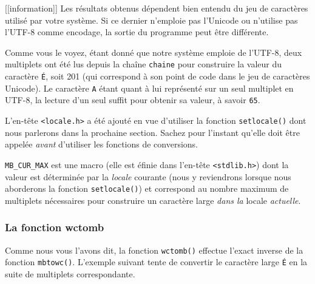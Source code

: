 \documentclass[]{article}
\begin{document}
{[}{[}information{]}{]} \textbar{} Les résultats obtenus dépendent bien
entendu du jeu de caractères utilisé par votre système. Si ce dernier
n'emploie pas l'Unicode ou n'utilise pas l'UTF-8 comme encodage, la
sortie du programme peut être différente.

Comme vous le voyez, étant donné que notre système emploie de l'UTF-8,
deux multiplets ont été lus depuis la chaîne \texttt{chaine} pour
construire la valeur du caractère \texttt{É}, soit 201 (qui correspond à
son point de code dans le jeu de caractères Unicode). Le caractère
\texttt{A} étant quant à lui représenté sur un seul multiplet en UTF-8,
la lecture d'un seul suffit pour obtenir sa valeur, à savoir
\texttt{65}.

L'en-tête \texttt{\textless{}locale.h\textgreater{}} a été ajouté en vue
d'utiliser la fonction \texttt{setlocale()} dont nous parlerons dans la
prochaine section. Sachez pour l'instant qu'elle doit être appelée
\emph{avant} d'utiliser les fonctions de conversions.

\texttt{MB\_CUR\_MAX} est une macro (elle est éfinie dans l'en-tête
\texttt{\textless{}stdlib.h\textgreater{}}) dont la valeur est
déterminée par la \emph{locale} courante (nous y reviendrons lorsque
nous aborderons la fonction \texttt{setlocale()}) et correspond au
nombre maximum de multiplets nécessaires pour construire un caractère
large \emph{dans la} locale \emph{actuelle}.

\subsubsection{La fonction wctomb}\label{la-fonction-wctomb}

Comme nous vous l'avons dit, la fonction \texttt{wctomb()} effectue
l'exact inverse de la fonction \texttt{mbtowc()}. L'exemple suivant
tente de convertir le caractère large \texttt{É} en la suite de
multiplets correspondante.
\end{document}

